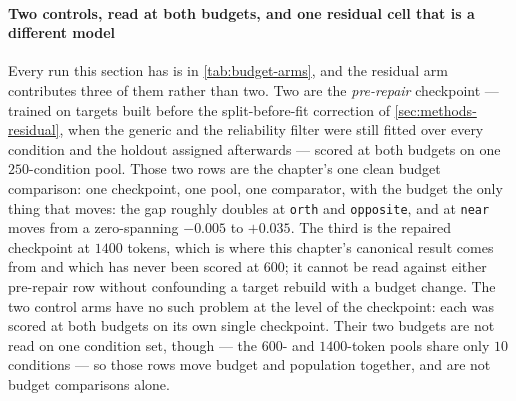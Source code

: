
\paragraph{Two controls, read at both budgets, and one residual cell that is a
different model}
 Every run this section has is in \cref{tab:budget-arms}, and the residual arm
contributes three of them rather than two. Two are the \emph{pre-repair}
checkpoint --- trained on targets built before the split-before-fit correction of
\cref{sec:methods-residual}, when the generic and the reliability filter were
still fitted over every condition and the holdout assigned afterwards --- scored
at both budgets on one $\num{250}$-condition pool. Those two rows are the
chapter's one clean budget comparison: one checkpoint, one pool, one comparator,
with the budget the only thing that moves: the gap roughly doubles at \texttt{orth} and \texttt{opposite}, and at \texttt{near} moves from a zero-spanning $-0.005$ to $+0.035$. The third is the repaired checkpoint at $1400$ tokens, which
is where this chapter's canonical result comes from and which has never been
scored at $600$; it cannot be read against either pre-repair row without
confounding a target rebuild with a budget change. The two
control arms have no such problem at the level of the checkpoint: each was scored
at both budgets on its own single checkpoint. Their two budgets are not read on
one condition set, though --- the $600$- and $1400$-token pools share only
$\num{10}$ conditions --- so those rows move budget and population together, and
are not budget comparisons alone.

